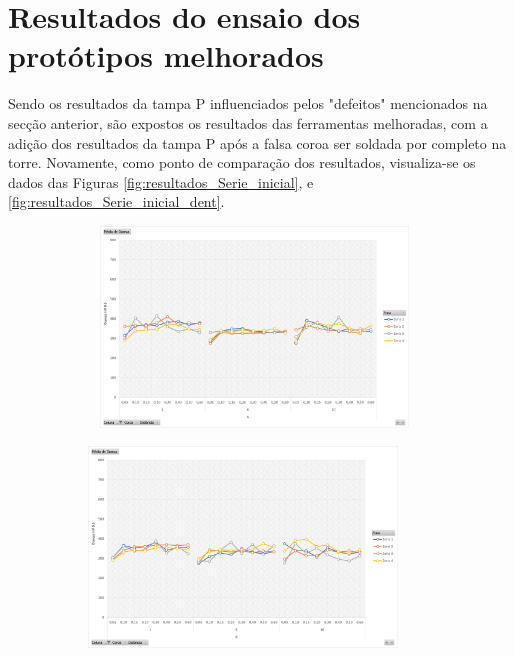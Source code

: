 \section{Resultados do ensaio dos protótipos melhorados} \label{sec:resultados_ensaios}
Sendo os resultados da tampa P influenciados pelos "defeitos" mencionados na secção anterior, são expostos os resultados das ferramentas melhoradas, com a adição dos resultados da tampa P após a falsa coroa ser soldada por completo na torre. Novamente, como ponto de comparação dos resultados, visualiza-se os dados das Figuras \ref{fig:resultados_Serie_inicial}, e \ref{fig:resultados_Serie_inicial_dent}.
\begin{figure}[htb]
    \centering
    \begin{subfigure}{.4\textwidth}\
        \centering
        \includegraphics[width = 0.9\textwidth]{Figures/Cap4/Grafico_4_Zonas_Y.png}
        \caption{}
        \label{fig:resultados_Tampa_Y}
    \end{subfigure}%
    \begin{subfigure}{.4\textwidth}
        \centering
        \includegraphics[width = 0.9\textwidth]{Figures/Cap4/Grafico_4_Zonas_O.png}

\end{subfigure}
\end{figure}
